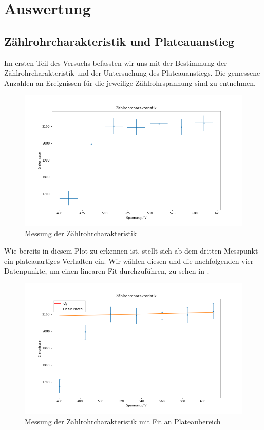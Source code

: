 \section{Auswertung}

\subsection{Zählrohrcharakteristik und Plateauanstieg}

Im ersten Teil des Versuchs befassten wir uns mit der Bestimmung der Zählrohrcharakteristik und der Untersuchung des Plateauanstiegs. Die gemessene Anzahlen an Ereignissen für die jeweilige Zählrohrspannung sind  zu entnehmen.

\begin{figure}[H]
  \centering
  \includegraphics[width=.9\textwidth]{files/bestimmungU0.png}
  \caption{Messung der Zählrohrcharakteristik}
  \label{plot:bestimmungU0}
\end{figure}

Wie bereits in diesem Plot zu erkennen ist, stellt sich ab dem dritten Messpunkt ein plateauartiges Verhalten ein. Wir wählen diesen und die nachfolgenden vier Datenpunkte, um einen linearen Fit durchzuführen, zu sehen in .

\begin{figure}[H]
  \centering
  \includegraphics[width=.9\textwidth]{files/bestimmungU0_fit_mean.png}
  \caption{Messung der Zählrohrcharakteristik mit Fit an Plateaubereich}
  \label{plot:bestimmungU0_fit_mean}
\end{figure}

